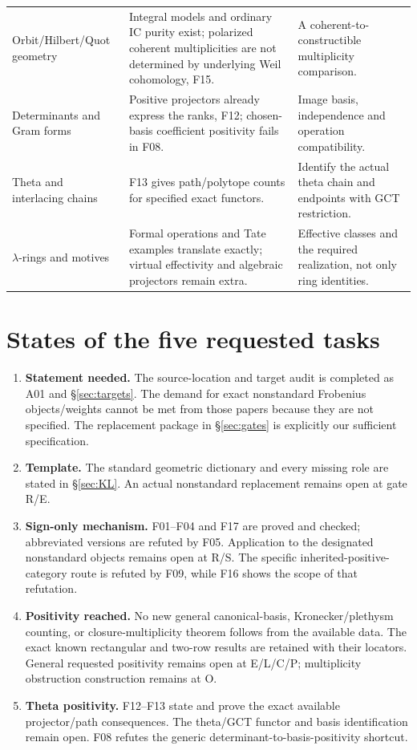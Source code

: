 \documentclass[11pt,a4paper]{article}
\theoremstyle{named}\newtheorem{finding}{Finding}[section]
\theoremstyle{definition}\newtheorem{definition}[finding]{Definition}
\theoremstyle{remark}\newtheorem{remark}[finding]{Remark}
\begin{document}
{\begin{longtable}{p{.23\linewidth}p{.40\linewidth}p{.29\linewidth}}
Orbit/Hilbert/Quot geometry&Integral models and ordinary IC purity exist; polarized coherent multiplicities are not determined by underlying Weil cohomology, F15.&A coherent-to-constructible multiplicity comparison.\\
Determinants and Gram forms&Positive projectors already express the ranks, F12; chosen-basis coefficient positivity fails in F08.&Image basis, independence and operation compatibility.\\
Theta and interlacing chains&F13 gives path/polytope counts for specified exact functors.&Identify the actual theta chain and endpoints with GCT restriction.\\
$\lambda$-rings and motives&Formal operations and Tate examples translate exactly; virtual effectivity and algebraic projectors remain extra.&Effective classes and the required realization, not only ring identities.\\\bottomrule
\end{longtable}}

\section{States of the five requested tasks}
\begin{enumerate}
\item \textbf{Statement needed.} The source-location and target audit is completed as A01 and \S\ref{sec:targets}. The demand for exact nonstandard Frobenius objects/weights cannot be met from those papers because they are not specified. The replacement package in \S\ref{sec:gates} is explicitly our sufficient specification.
\item \textbf{Template.} The standard geometric dictionary and every missing role are stated in \S\ref{sec:KL}. An actual nonstandard replacement remains open at gate R/E.
\item \textbf{Sign-only mechanism.} F01--F04 and F17 are proved and checked; abbreviated versions are refuted by F05. Application to the designated nonstandard objects remains open at R/S. The specific inherited-positive-category route is refuted by F09, while F16 shows the scope of that refutation.
\item \textbf{Positivity reached.} No new general canonical-basis, Kronecker/plethysm counting, or closure-multiplicity theorem follows from the available data. The exact known rectangular and two-row results are retained with their locators. General requested positivity remains open at E/L/C/P; multiplicity obstruction construction remains at O.
\item \textbf{Theta positivity.} F12--F13 state and prove the exact available projector/path consequences. The theta/GCT functor and basis identification remain open. F08 refutes the generic determinant-to-basis-positivity shortcut.
\end{enumerate}
\end{document}
